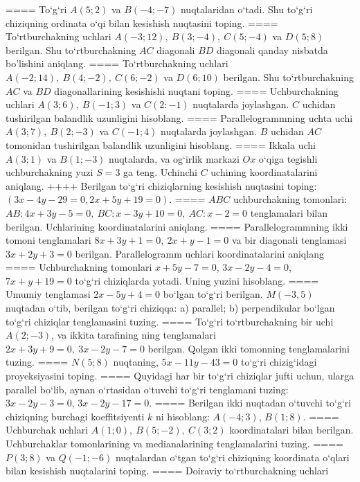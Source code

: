 ====
To‘g‘ri \(A (5;2) \) va \(B (-4; -7) \) nuqtalaridan o‘tadi.
Shu to‘g‘ri chiziqning ordinata o‘qi bilan kesishish nuqtasini toping.
====
To‘rtburchakning uchlari
\(A (-3;12),\ B (3;-4),\ C (5;-4) \) va \(D (5;8) \) berilgan. Shu
to‘rtburchakning $AC$ diagonali $BD$ diagonali qanday
nisbatda bo'lishini aniqlang.
====
To‘rtburchakning uchlari
\(A (-2;14),\ B (4;-2),\ C (6;-2) \) va \(D (6;10) \) berilgan. Shu
to‘rtburchakning $AC$ va $BD$ diagonallarining kesishishi
nuqtani toping.
====
Uchburchakning uchlari \(A (3;6),\ B (-1;3) \) va
\(C (2:-1) \) nuqtalarda joylashgan. $C$ uchidan tushirilgan balandlik uzunligini hisoblang.
====
Parallelogrammning uchta uchi \(A (3;7),\ B (2;-3) \) va
\(C (-1;4) \) nuqtalarda joylashgan. $B$ uchidan $AC$
tomonidan tushirilgan balandlik uzunligini hisoblang.
====
Ikkala uchi \(A (3;1) \) va \(B (1;-3) \) nuqtalarda, va
og‘irlik markazi $Ox$ o‘qiga tegishli uchburchakning yuzi
\(S=3\) ga teng. Uchinchi $C$ uchining koordinatalarini aniqlang.
++++
Berilgan to‘g‘ri chiziqlarning kesishish nuqtasini toping:
$(3x-4y-29=0, 2x+5y+19=0)$.
====
$ABC$ uchburchakning tomonlari:
\(AB:4x+3y-5=0,\ BC:x-3y+10=0,\ AC:x-2=0\) 
tenglamalari bilan berilgan. Uchlarining koordinatalarini aniqlang.
====
Parallelogrammning ikki tomoni tenglamalari
\(8x+3y+1=0,\ 2x+y-1=0\) va bir diagonali tenglamasi
\(3x+2y+3=0\) berilgan. Parallelogramm uchlari koordinatalarini
aniqlang
====
Uchburchakning tomonlari \(x+5y-7=0\),
\(3x-2y-4=0\), \(7x+y+19=0\) to‘g‘ri chiziqlarda yotadi. Uning
yuzini hisoblang.
====
Umumiy tenglamasi \(2x-5y+4=0\) bo‘lgan to‘g‘ri
berilgan. \(M (-3,5) \) nuqtadan o‘tib, berilgan to‘g‘ri chiziqqa: a) parallel;
b) perpendikular bo‘lgan to‘g‘ri chiziqlar tenglamasini tuzing.
====
To‘g‘ri to‘rtburchakning bir uchi \(A (2;-3) \), va ikkita tarafining
ning tenglamalari \(2x+3y+9=0,\ 3x-2y-7=0\)
berilgan. Qolgan ikki tomonning tenglamalarini tuzing.
====
\(N (5;8) \) nuqtaning, \(5x-11y-43=0\) to‘g‘ri chizig‘idagi
proyeksiyasini toping.
====
Quyidagi har bir to‘g‘ri chiziqlar jufti uchun, ularga parallel
bo‘lib, aynan o‘rtasidan o‘tuvchi to‘g‘ri tenglamani tuzing: $3x-2y-3=0$, $3x-2y-17=0$.
====
Berilgan ikki nuqtadan o‘tuvchi to‘g‘ri chiziqning burchagi
koeffitsiyenti $k$ ni hisoblang: $A (-4;3) $, $B (1;8) $.
====
Uchburchak uchlari \(A (1;0),\ B (5;-2),\ C (3;2) \)
koordinatalari bilan berilgan. Uchburchaklar tomonlarining va
medianalarining tenglamalarini tuzing.
====
\(P (3;8) \) va \(Q (-1;-6) \) nuqtalardan o‘tgan
to‘g‘ri chiziqning koordinata o‘qlari bilan kesishish nuqtalarini toping.
====
Doiraviy to‘rtburchakning uchlari
